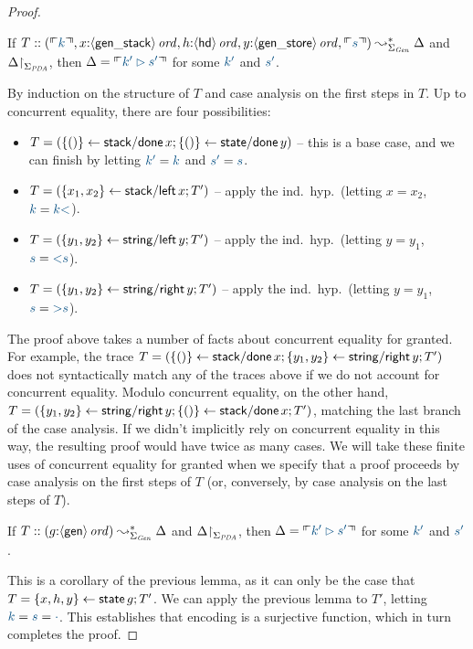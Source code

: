 \begin{proof}
\begin{lemma} If 
$T :: (\ctxinterp{k}, 
       x{:}\istrue{\susp{\sf gen\_stack}}, 
       h{:}\istrue{\susp{\sf hd}},
       y{:}\istrue{\susp{\sf gen\_store}},
       \ctxinterp{s}) 
  \leadsto^*_{\Sigma_{\it Gen}} \Delta$ and
${\Delta}{\upharpoonright}_{\Sigma_{\it
      PDA}}$, then $\Delta = \ctxinterp{k' \rhd s'}$ for some $\obj{k'}$
and $\obj{s'}$.
\end{lemma}
\noindent
By induction on the structure of $T$ and case analysis on the 
first steps in $T$. Up to concurrent equality, there
are four possibilities:
\smallskip
\begin{itemize}
\item $T = (\{{()}\} \leftarrow {{\sf stack/done}\,x}; \{{()}\} \leftarrow {{\sf
      state/done}\,y})$ -- this is a base case, and we can finish by
  letting $\obj{k'} = \obj{k}$ and $\obj{s'} = \obj{s}$.
\item $T = (\{{x_1,x_2}\} \leftarrow {{\sf stack/left}\,x}; T')$ -- apply 
  the ind.~hyp.~(letting $x = x_2$, $\obj{k} =
  \obj{k{\sf <}}$).
\item $T = (\{{y_1,y_2}\} \leftarrow {{\sf string/left}\,y}; T')$ -- apply
  the ind.~hyp.~(letting $y = y_1$, $\obj{s} =
  \obj{{\sf <}s}$).
\item $T = (\{{y_1,y_2}\} \leftarrow {{\sf string/right}\,y}; T')$ -- apply
  the ind.~hyp.~(letting $y = y_1$, $\obj{s} =
  \obj{{\sf >}s}$).
\end{itemize}
\smallskip 
The proof above takes
a number of facts about concurrent equality for granted. 
%
For example, the trace $T = (\{{()}\} \leftarrow {{\sf stack/done}\,x};
\{{y_1,y_2}\} \leftarrow {{\sf string/right}\,y}; T')$ does not syntactically
match any of the traces above if we do not account for concurrent
equality. Modulo concurrent equality, on the other hand, $T =
(\{{y_1,y_2}\} \leftarrow {{\sf string/right}\,y}; \{{()}\} \leftarrow {{\sf
    stack/done}\,x}; T')$, matching the last branch of the case
analysis.  If we didn't implicitly rely on concurrent equality in this
way, the resulting proof would have twice as many cases.  We will take
these finite uses of concurrent equality for granted when we specify
that a proof proceeds by case analysis on the first steps of $T$ (or,
conversely, by case analysis on the last steps of $T$).

\begin{lemma} If 
$T :: (g{:}{\langle {\sf gen} \rangle}\,{{\it ord}}) 
  \leadsto^*_{\Sigma_{\it Gen}} \Delta$ and
${\Delta}{\upharpoonright}_{\Sigma_{\it
      PDA}}$, then $\Delta = \ctxinterp{k' \rhd s'}$ for some $\obj{k'}$
and $\obj{s'}$.
\end{lemma}
\noindent
This is a corollary of the previous lemma, as it can only
be the case that $T = \{{x,h,y}\} \leftarrow {{\sf state}\,g}; T'$. We can apply the previous
lemma to $T'$, letting $\obj{k} = \obj{s} = \obj{\cdot}$.
This establishes that encoding is a surjective function, which in turn
completes the proof. 
\end{proof}

